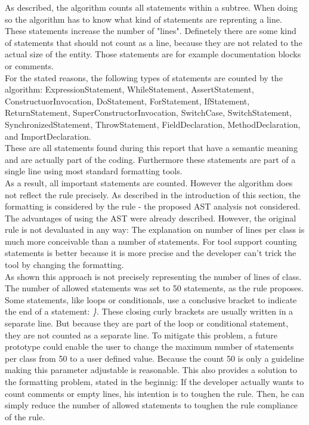 As described, the algorithm counts all statements within a subtree. When doing so the algorithm has to know what kind of statements are reprenting a line. These statements increase the number of "lines". Definetely there are some kind of statements that should not count as a line, because they are not related to the actual size of the entity. Those statements are for example documentation blocks or comments. 
\\

For the stated reasons, the following types of statements are counted by the algorithm: ExpressionStatement, WhileStatement, AssertStatement, ConstructuorInvocation, DoStatement, ForStatement, IfStatement, ReturnStatement, SuperConstructorInvocation, SwitchCase, SwitchStatement, SynchronizedStatement, ThrowStatement, FieldDeclaration, MethodDeclaration, and ImportDeclaration.
\\

These are all statements found during this report that have a semantic meaning and are actually part of the coding. Furthermore these statements are part of a single line using most standard formatting tools.
\\

As a result, all important statements are counted. However the algorithm does not reflect the rule precisely. As described in the introduction of this section, the formatting is considered by the rule - the proposed \ac{AST} analysis not considered. The advantages of using the \ac{AST} were already described. However, the original rule is not devaluated in any way: The explanation on number of lines per class is much more conceivable than a number of statements. For tool support counting statements is better because it is more precise and the developer can't trick the tool by changing the formatting.
\\

As shown this approach is not precisely representing the number of lines of class. The number of allowed statements was set to 50 statements, as the rule proposes. Some statements, like loops or conditionals, use a conclusive bracket to indicate the end of a statement: \textit{\}}. These closing curly brackets are usually written in a separate line. But because they are part of the loop or conditional statement, they are not counted as a separate line. To mitigate this problem, a future prototype could enable the user to change the maximum number of statements per class from 50 to a user defined value. Because the count 50 is only a guideline making this parameter adjustable is reasonable. This also provides a solution to the formatting problem, stated in the beginnig: If the developer actually wants to count comments or empty lines,  his intention is to toughen the rule. Then, he can simply reduce the number of allowed statements to toughen the rule compliance of the rule. 
\\

